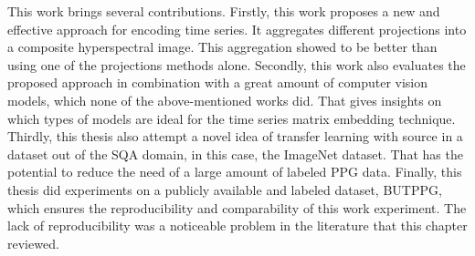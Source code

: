 This work brings several contributions. Firstly, this work proposes a new and effective approach for encoding time series. It aggregates different projections into a composite hyperspectral image. This aggregation showed to be better than using one of the projections methods alone. Secondly, this work also evaluates the proposed approach in combination with a great amount of computer vision models, which none of the above-mentioned works did. That gives insights on which types of models are ideal for the time series matrix embedding technique. Thirdly, this thesis also attempt a novel idea of transfer learning with source in a dataset out of the \gls{SQA} domain, in this case, the ImageNet dataset. That has the potential to reduce the need of a large amount of labeled \gls{PPG} data. Finally, this thesis did experiments on a publicly available and labeled dataset, \gls{BUTPPG}, which ensures the reproducibility and comparability of this work experiment. The lack of reproducibility was a noticeable problem in the literature that this chapter reviewed.     
